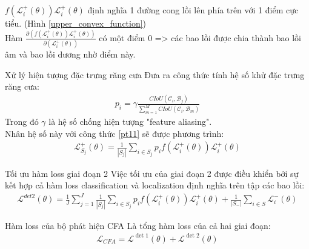 \documentclass[11pt]{beamer}
\theoremstyle{definition}
\theoremstyle{plain}
\theoremstyle{plain}
\theoremstyle{remark}
\begin{document}
\begin{frame}
	$f\left(\mathcal{L}_i^{+}(\theta)\right) \mathcal{L}_i^{+}(\theta)$ định nghĩa 1 đường cong lồi lên phía trên với 1 điểm cực tiểu. (Hình \ref{upper_convex_function})\\
Hàm	$\frac{\partial\left(f\left(\mathcal{L}_i^{+}(\theta)\right) \mathcal{L}_i^{+}(\theta)\right)}{\partial\left(\mathcal{L}_i^{+}(\theta)\right)}$ có một điểm 0 => các bao lồi được chia thành bao lồi âm và bao lồi dương nhờ điểm này.\\
	
\end{frame}
\begin{frame}{Xử lý hiện tượng đặc trưng răng cưa}
	Đưa ra công thức tính hệ số khử đặc trưng răng cưa:
	\begin{align} \label{ptdd8}
		p_i = \gamma \frac{CIoU (\mathcal{C}_i, \mathcal{B}_j)}{\sum_{m=1}^{M} CIoU (\mathcal{C}_i, \mathcal{B}_m)}
	\end{align}
	Trong đó $\gamma$ là hệ số chống hiện tượng "feature aliasing".\\
Nhân hệ số này với công thức \ref{pt11} sẽ được phương trình:
\begin{align} \label{pt13}
	\mathcal{L}_{S_j}^+ (\theta) = \frac{1}{|S_j|} \sum_{i \in {S_j}} p_i f(\mathcal{L}_i^+(\theta)) \mathcal{L}_i^{+}(\theta) 
\end{align}


\end{frame}
\begin{frame}{Tối ưu hàm loss giai đoạn 2}
	Việc tối ưu của giai đoạn 2 được điều khiển bởi sự kết hợp cả hàm loss classification và localization định nghĩa trên tập các bao lồi:\\
	\begin{align} \label{ptdd10}
	\mathcal{L}^{det2} (\theta) = \frac{1}{J} \sum_{j=1}^{J} \frac{1}{|S_j|} \sum_{i \in {S_j}} p_i f(\mathcal{L}_i^+(\theta)) \mathcal{L}_i^{+}(\theta)  + \frac{1}{|S_-|} \sum_{i \in S} \mathcal{L}_i^- (\theta) 
	\end{align}
\end{frame}
\begin{frame}{Hàm loss của bộ phát hiện CFA}
	Là tổng hàm loss của cả hai giai đoạn:
	\begin{align}
		\mathcal{L}_{CFA} = \mathcal{L}^{\operatorname{det} 1}(\theta)+\mathcal{L}^{\operatorname{det} 2}(\theta)
	\end{align}

\end{frame}
\end{document}
